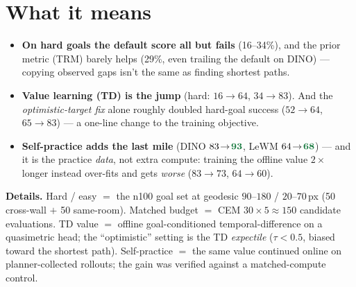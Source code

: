 \documentclass[11pt]{article}
\newcommand{\g}[1]{\textcolor{good}{\textbf{#1}}}
\newcommand{\rd}[1]{\textcolor{bad}{#1}}
\begin{document}
\section{What it means}
\begin{itemize}[leftmargin=1.4em,itemsep=0.8ex,topsep=0.4ex]
\item \textbf{On hard goals the default score all but fails} (\rd{16--34\%}), and the prior metric (TRM)
barely helps (29\%, even trailing the default on \textsf{DINO}) --- copying observed gaps isn't the same as
finding shortest paths.
\item \textbf{Value learning (TD) is the jump} (hard: $16\!\to\!64$, $34\!\to\!83$). And the
\emph{optimistic-target fix} alone roughly doubled hard-goal success ($52\!\to\!64$, $65\!\to\!83$) --- a
one-line change to the training objective.
\item \textbf{Self-practice adds the last mile} (\textsf{DINO} $83\!\to\!\g{93}$, \textsf{LeWM}
$64\!\to\!\g{68}$) --- and it is the practice \emph{data}, not extra compute: training the offline value
$2\times$ longer instead over-fits and gets \emph{worse} ($83\!\to\!73$, $64\!\to\!60$).
\end{itemize}

\vspace{1.4em}
{\footnotesize\color{gray}
\textbf{Details.} Hard / easy $=$ the n100 goal set at geodesic $90$--$180$ / $20$--$70$\,px (50 cross-wall
$+$ 50 same-room). Matched budget $=$ CEM $30\times5\approx150$ candidate evaluations. TD value $=$ offline
goal-conditioned temporal-difference on a quasimetric head; the ``optimistic'' setting is the TD
\emph{expectile} ($\tau\!<\!0.5$, biased toward the shortest path). Self-practice $=$ the same value
continued online on planner-collected rollouts; the gain was verified against a matched-compute control.}
\end{document}
